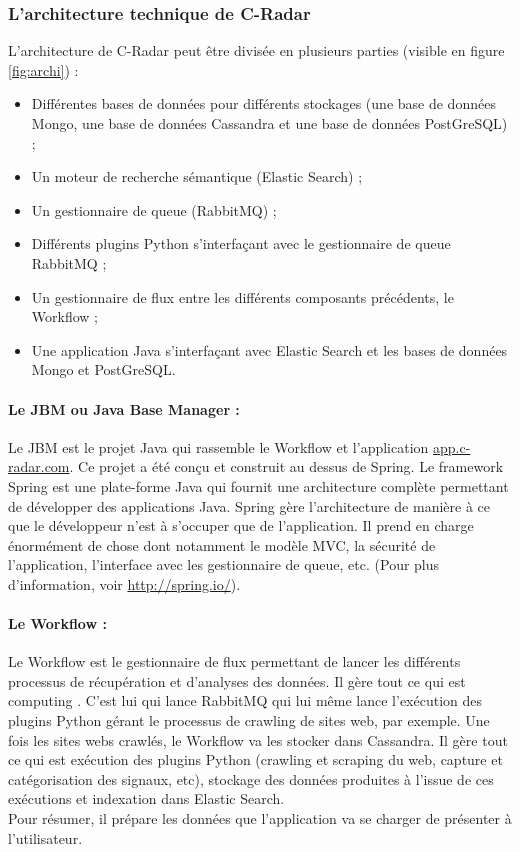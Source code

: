         \subsubsection{L'architecture technique de C-Radar}
        \label{subsub:archi_tech}
            L'architecture de C-Radar peut être divisée en plusieurs parties (visible en figure \ref{fig:archi}) :
            \begin{itemize}
                \item Différentes bases de données pour différents stockages (une base de données Mongo, une base de données Cassandra et une base de données PostGreSQL) ;
                \item Un moteur de recherche sémantique (Elastic Search) ;
                \item Un gestionnaire de queue (RabbitMQ) ;
                \item Différents plugins Python s'interfaçant avec le gestionnaire de queue RabbitMQ ;
                \item Un gestionnaire de flux entre les différents composants précédents, le Workflow ;
                \item Une application Java s'interfaçant avec Elastic Search et les bases de données Mongo et PostGreSQL.
            \end{itemize}

            \paragraph{Le JBM ou Java Base Manager :}
                Le JBM est le projet Java qui rassemble le Workflow et l'application \href{app.c-radar.com}{app.c-radar.com}. Ce projet a été conçu et construit au dessus de Spring. Le framework Spring est une plate-forme Java qui fournit une architecture complète permettant de développer des applications Java. Spring gère l'architecture de manière à ce que le développeur n'est à s'occuper que de l'application. Il prend en charge énormément de chose dont notamment le modèle MVC, la sécurité de l'application, l'interface avec les gestionnaire de queue, etc. (Pour plus d'information, voir \href{http://spring.io/}{http://spring.io/}).

            \paragraph{Le Workflow :}
                Le Workflow est le gestionnaire de flux permettant de lancer les différents processus de récupération et d'analyses des données. Il gère tout ce qui est \og computing \fg. C'est lui qui lance RabbitMQ qui lui même lance l'exécution des plugins Python gérant le processus de crawling de sites web, par exemple. Une fois les sites webs crawlés, le Workflow va les stocker dans Cassandra. Il gère tout ce qui est exécution des plugins Python (crawling et scraping du web, capture et catégorisation des signaux, etc), stockage des données produites à l'issue de ces exécutions et indexation dans Elastic Search.\\
                Pour résumer, il prépare les données que l'application va se charger de présenter à l'utilisateur.

